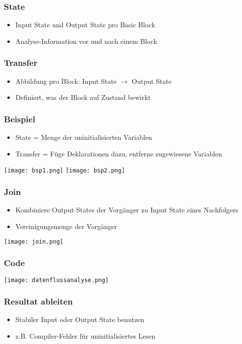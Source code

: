 \subsubsection{State}
\begin{itemize}
    \item Input State und Output State pro Basic Block
    \item Analyse-Information vor und nach einem Block
\end{itemize}

\subsubsection{Transfer}
\begin{itemize}
    \item Abbildung pro Block: Input State $\rightarrow$ Output State
    \item Definiert, was der Block auf Zustand bewirkt
\end{itemize}

\subsubsection{Beispiel}
\begin{itemize}
    \item State = Menge der uninitialisierten Variablen
    \item Transfer = Füge Deklarationen dazu, entferne zugewiesene Variablen
\end{itemize}
\texttt{[image: bsp1.png]}
\texttt{[image: bsp2.png]}

\subsubsection{Join}
\begin{itemize}
    \item Kombiniere Output States der Vorgänger zu Input State eines Nachfolgers
    \item Vereinigungsmenge der Vorgänger
\end{itemize}
\texttt{[image: join.png]}

\subsubsection{Code}
\texttt{[image: datenflussanalyse.png]}

\subsubsection{Resultat ableiten}
\begin{itemize}
    \item Stabiler Input oder Output State benutzen
    \item z.B. Compiler-Fehler für uninitialisiertes Lesen
\end{itemize}

